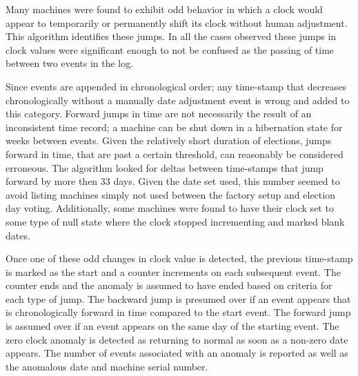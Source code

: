 Many machines were found to exhibit odd behavior in which a clock would appear
to temporarily or permanently shift its clock without human adjustment. This
algorithm identifies these jumps.  In all the cases observed these jumps in
clock values were significant enough to not be confused as the passing of time
between two events in the log. 

Since events are appended in chronological order; any time-stamp that decreases
chronologically without a manually date adjustment event is wrong and added to
this category. Forward jumps in time are not necessarily the result of an
inconsistent time record; a machine can be shut down in a hibernation state for
weeks between events. Given the relatively short duration of elections, jumps
forward in time, that are past a certain threshold, can reasonably be considered
erroneous. The algorithm looked for deltas between time-stamps that jump
forward by more then 33 days. Given the date set used, this number seemed to
avoid listing machines simply not used between the factory setup and election
day voting. Additionally, some machines were found to have their clock set to
some type of null state where the clock stopped incrementing and marked blank
dates. 

Once one of these odd changes in clock value is detected, the previous
time-stamp is marked as the start and a counter increments on each subsequent
event.  The counter ends and the anomaly is assumed to have ended based on
criteria for each type of jump. The backward jump is presumed over if an event
appears that is chronologically forward in time compared to the start event.
The forward jump is assumed over if an event appears on the same day of the
starting event.  The zero clock anomaly is detected as returning to normal as
soon as a non-zero date appears. The number of events associated with an anomaly
is reported as well as the anomalous date and machine serial number. 

